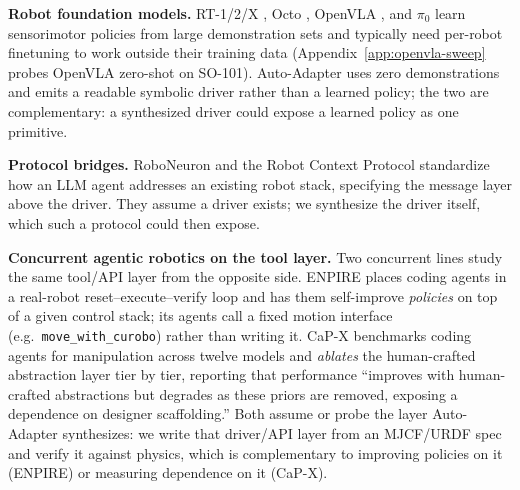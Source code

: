 \noindent\textbf{Robot foundation models.} RT-1/2/X
\citep{brohan2022rt1, brohan2023rt2, openxembodiment2024}, Octo
\citep{octo2024}, OpenVLA \citep{kim2024openvla}, and $\pi_0$
\citep{black2024pi0} learn sensorimotor policies from large
demonstration sets and typically need per-robot finetuning to work
outside their training data (Appendix~\ref{app:openvla-sweep} probes
OpenVLA zero-shot on SO-101). Auto-Adapter uses zero demonstrations and
emits a readable symbolic driver rather than a learned policy;
the two are complementary: a synthesized driver could expose a
learned policy as one primitive.

\noindent\textbf{Protocol bridges.} RoboNeuron \citep{roboneuron2025}
and the Robot Context Protocol \citep{rcp2025} standardize how an LLM
agent addresses an existing robot stack, specifying the message layer
above the driver. They assume a driver exists; we synthesize the
driver itself, which such a protocol could then expose.

\noindent\textbf{Concurrent agentic robotics on the tool layer.}
Two concurrent lines study the same tool/API layer from the opposite
side. ENPIRE \citep{enpire2026} places coding agents in a real-robot
reset--execute--verify loop and has them self-improve \emph{policies}
on top of a given control stack; its agents call a fixed motion
interface (e.g.\ \texttt{move\_with\_curobo}) rather than writing it.
CaP-X \citep{capx2026} benchmarks coding agents for manipulation across
twelve models and \emph{ablates} the human-crafted abstraction layer
tier by tier, reporting that performance ``improves with human-crafted
abstractions but degrades as these priors are removed, exposing a
dependence on designer scaffolding.'' Both assume or probe the layer
Auto-Adapter synthesizes: we write that driver/API layer from an
MJCF/URDF spec and verify it against physics, which is complementary
to improving policies on it (ENPIRE) or measuring dependence on it
(CaP-X).
